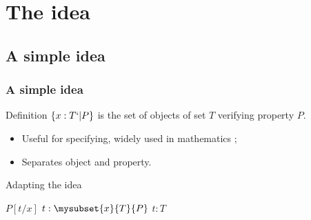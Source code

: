 \frame{\tableofcontents}

\section{The idea}

\subsection{A simple idea}
\begin{frame}
  \frametitle{A simple idea}
  
  \begin{block}{Definition}
    $\{ x : T `| P \}$ is the set of objects of set $T$ verifying property $P$. 
  \end{block}
  
  \begin{itemize}
  \item Useful for specifying, widely used in mathematics ;    
  \item Separates object and property.
  \end{itemize}
  \pause
  \begin{block}{Adapting the idea} 
    \begin{center}
      {$P[t/x]$}
      {$t : \mysubset{x}{T}{P}$}
      {}\DP\quad      
      {$t : T$}
      {}
      \DP
    \end{center}
  \end{block}  
\end{frame}

